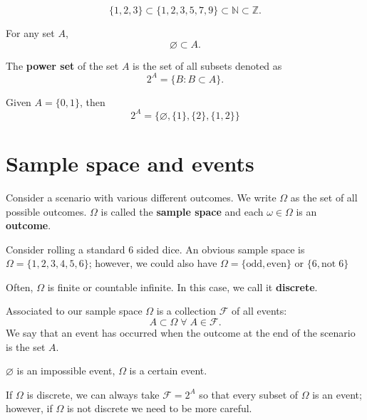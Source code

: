 \begin{example}
    \[ \{ 1, 2, 3 \} \subset \{ 1, 2, 3, 5, 7, 9 \} \subset \mathbb{N} \subset \mathbb{Z}. \]
\end{example}

\begin{remark}
    For any set $A$, \[\varnothing \subset A.\]
\end{remark}

\begin{definition}
    The \textbf{power set} of the set $A$ is the set of all subsets denoted as \[ 2^A = \{ B : B \subset A \}. \]
\end{definition}

\begin{example}
    Given $A = \{ 0, 1 \}$, then \[ 2^A = \{ \varnothing, \{ 1 \}, \{ 2 \}, \{ 1, 2 \} \} \]
\end{example}

\section{Sample space and events}

Consider a scenario with various different outcomes. We write $\Omega$ as the set of all possible outcomes. $\Omega$ is called the \textbf{sample space} and each $\omega \in \Omega$ is an \textbf{outcome}.

\begin{example}
    Consider rolling a standard 6 sided dice. An obvious sample space is $\Omega = \{ 1, 2, 3, 4, 5, 6 \}$; however, we could also have $\Omega = \{ \text{odd}, \text{even} \}$ or $\{ 6, \text{not} \; 6 \}$
\end{example}

Often, $\Omega$ is finite or countable infinite. In this case, we call it \textbf{discrete}.

\begin{definition}[Events]
    Associated to our sample space $\Omega$ is a collection $\mathcal{F}$ of all events: \[ A \subset \Omega \; \forall \; A \in \mathcal{F}. \] We say that an event has occurred when the outcome at the end of the scenario is the set $A$.
\end{definition}

\begin{remark}
    $\varnothing$ is an impossible event, $\Omega$ is a certain event.
\end{remark}

If $\Omega$ is discrete, we can always take $\mathcal{F} = 2^A$ so that every subset of $\Omega$ is an event; however, if $\Omega$ is not discrete we need to be more careful.


